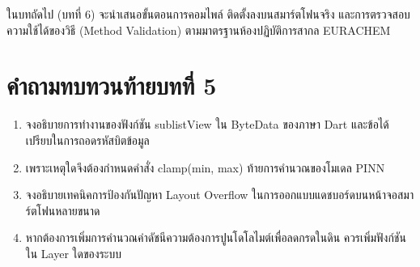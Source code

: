 ในบทถัดไป (บทที่ 6) จะนำเสนอขั้นตอนการคอมไพล์ ติดตั้งลงบนสมาร์ตโฟนจริง และการตรวจสอบความใช้ได้ของวิธี (Method Validation) ตามมาตรฐานห้องปฏิบัติการสากล EURACHEM

\section*{คำถามทบทวนท้ายบทที่ 5}

\begin{enumerate}
    \item จงอธิบายการทำงานของฟังก์ชัน sublistView ใน ByteData ของภาษา Dart และข้อได้เปรียบในการถอดรหัสบิตข้อมูล
    \item เพราะเหตุใดจึงต้องกำหนดคำสั่ง clamp(min, max) ท้ายการคำนวณของโมเดล PINN
    \item จงอธิบายเทคนิคการป้องกันปัญหา Layout Overflow ในการออกแบบแดชบอร์ดบนหน้าจอสมาร์ตโฟนหลายขนาด
    \item หากต้องการเพิ่มการคำนวณค่าดัชนีความต้องการปูนโดโลไมต์เพื่อลดกรดในดิน ควรเพิ่มฟังก์ชันใน Layer ใดของระบบ
\end{enumerate}
